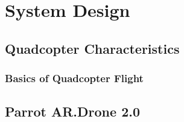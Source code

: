 
\chapter{System Design\label{ch:system}}

\section{Quadcopter Characteristics}



\subsection{Basics of Quadcopter Flight}

\section{Parrot AR.Drone 2.0}

